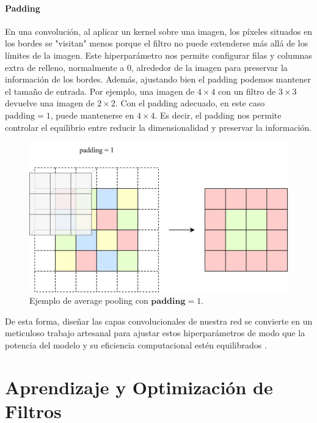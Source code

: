 \paragraph{Padding}

En una convolución, al aplicar un kernel sobre una imagen, los píxeles situados en los bordes se "visitan" menos porque el filtro no puede extenderse más allá de los límites de la imagen. Este hiperparámetro nos permite configurar filas y columnas extra de relleno, normalmente a $0$, alrededor de la imagen para preservar la información de los bordes. Además, ajustando bien el padding podemos mantener el tamaño de entrada. Por ejemplo, una imagen de $4 \times 4$ con un filtro de $3 \times 3$ devuelve una imagen de $2 \times 2$. Con el padding adecuado, en este caso $\text{padding}=1$, puede mantenerse en $4 \times 4$. Es decir, el padding nos permite controlar el equilibrio entre reducir la dimensionalidad y preservar la información.

\begin{figure}[h]
	\centering
	\includegraphics[width=0.8\linewidth]{figures/ejemplos/padding_avg_pooling.png}
	\caption{Ejemplo de average pooling con $\textbf{padding}=1$.}
	\label{fig:padding_avg_pooling}
\end{figure}

De esta forma, diseñar las capas convolucionales de nuestra red se convierte en un meticuloso trabajo artesanal para ajustar estos hiperparámetros de modo que la potencia del modelo y su eficiencia computacional estén equilibrados \cite{dl_python__chollet_2021, dl_fundamentos__casas_roma_2020, dl__goodfellow_2016}.



\section{Aprendizaje y Optimización de Filtros}\label{sec:ajuste_parametros_cnn}

